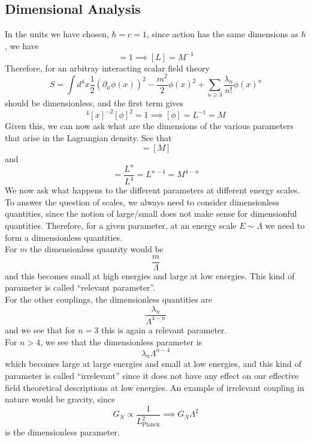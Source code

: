 \documentclass[11pt, notitlepage]{report}
\newcommand{\del}{\partial}
\numberwithin{equation}{section}
\begin{document}
\subsection{Dimensional Analysis}
In the units we have chosen, \(\hbar = c = 1\), since action has the same dimensions as \(\hbar\), we have 
\begin{equation*}
    [S] = 1 \implies [L] = M^{-1}
\end{equation*}
Therefore, for an arbitray interacting scalar field theory 
\begin{equation*}
    S = \int d^4x \frac{1}{2}(\del_\mu \phi(x))^2 - \frac{m^2}{2}\phi(x)^2 + \sum_{n\ge 3}\frac{\lambda_n}{n!}\phi(x)^n
\end{equation*}
should be dimensionless, and the first term gives
\begin{equation*}
    [x]^4[x]^{-2}[\phi]^2 = 1 \implies [\phi]= L^{-1} = M
\end{equation*}
Given this, we can now ask what are the dimensions of the various parameters that arise in the Lagrangian density. See that 
\begin{equation*}
    [m] = [M]
\end{equation*}
and
\begin{equation*}
    [\lambda_n] = \frac{L^n}{L^4} = L^{n-4} = M^{4-n}
\end{equation*}
We now ask what happens to the different parameters at different energy scales. To answer the question of scales, we always need to consider dimensionless quantities, since the notion of large/small does not make sense for dimensionful quantities. Therefore, for a given parameter, at an energy scale \(E\sim \Lambda\) we need to form a dimensionless quantities. \\

For \(m\) the dimensionless quantity would be 
\begin{equation*}
    \frac{m}{\Lambda}
\end{equation*}
and this becomes small at high energies and large at low energies. This kind of parameter is called ``relevant parameter''. \\
For the other couplings, the dimensionless quantities are 
\begin{equation*}
    \frac{\lambda_n}{\Lambda^{4-n}}
\end{equation*}
and we see that for \(n=3\) this is again a relevant parameter. \\
For \(n>4\), we see that the dimensionless parameter is 
\begin{equation*}
    \lambda_n \Lambda^{n-4}
\end{equation*}
which becomes large at large energies and small at low energies, and this kind of parameter is called ``irrelevant'' since it does not have any effect on our effective field theoretical descriptions at low energies. An example of irrelevant coupling in nature would be gravity, since 
\begin{equation*}
    G_N \propto \frac{1}{L_{\text{Planck}}^2} \implies G_N\Lambda^2
\end{equation*} is the dimensionless parameter. \\
\end{document}
